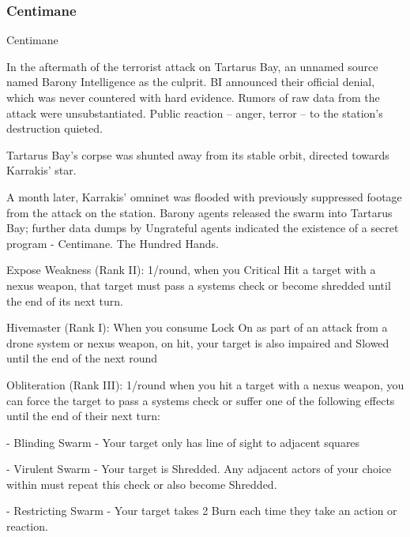 \subsubsection{Centimane}

                                                   Centimane

In the aftermath of the terrorist attack on Tartarus Bay, an unnamed source named Barony Intelligence as
the culprit. BI announced their official denial, which was never countered with hard evidence. Rumors of raw
data from the attack were unsubstantiated. Public reaction -- anger, terror -- to the station’s destruction
quieted.

 Tartarus Bay’s corpse was shunted away from its stable orbit, directed towards Karrakis’ star.

A month later, Karrakis’ omninet was flooded with previously suppressed footage from the attack on the
station. Barony agents released the swarm into Tartarus Bay; further data dumps by Ungrateful agents
indicated the existence of a secret program - Centimane. The Hundred Hands.




Expose Weakness (Rank II): 1/round, when you Critical Hit a target with a nexus weapon, that
target must pass a systems check or become shredded until the end of its next turn.

Hivemaster (Rank I): When you consume Lock On as part of an attack from a drone system or
nexus weapon, on hit, your target is also impaired and Slowed until the end of the next round

Obliteration (Rank III): 1/round when you hit a target with a nexus weapon, you can force the
target to pass a systems check or suffer one of the following effects until the end of their next
turn:

	        - Blinding Swarm - Your target only has line of sight to adjacent squares

	        - Virulent Swarm - Your target is Shredded. Any adjacent actors of your choice within
must repeat this check or also become Shredded.

	        - Restricting Swarm - Your target takes 2 Burn each time they take an action or reaction.
